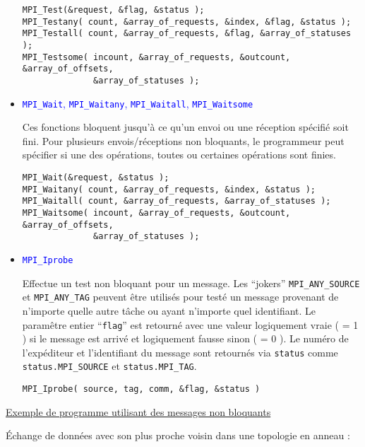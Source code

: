 \documentclass[11pt,a4paper]{article}
\begin{document}
\begin{itemize}
\begin{lstlisting}[style=customcpp]
MPI_Test(&request, &flag, &status );
MPI_Testany( count, &array_of_requests, &index, &flag, &status );
MPI_Testall( count, &array_of_requests, &flag, &array_of_statuses );
MPI_Testsome( incount, &array_of_requests, &outcount, &array_of_offsets, 
              &array_of_statuses );
\end{lstlisting}

\item \textcolor{blue}{\texttt{MPI\_Wait}, \texttt{MPI\_Waitany}, \texttt{MPI\_Waitall}, \texttt{MPI\_Waitsome}}

Ces fonctions bloquent jusqu'à ce qu'un envoi ou une réception spécifié soit fini. Pour plusieurs envois/réceptions
non bloquants, le programmeur peut spécifier si une des opérations, toutes ou certaines opérations sont finies.

\begin{lstlisting}[style=customcpp]
MPI_Wait(&request, &status );
MPI_Waitany( count, &array_of_requests, &index, &status );
MPI_Waitall( count, &array_of_requests, &array_of_statuses );
MPI_Waitsome( incount, &array_of_requests, &outcount, &array_of_offsets, 
              &array_of_statuses );
\end{lstlisting}

\item \textcolor{blue}{\texttt{MPI\_Iprobe}}

Effectue un test non bloquant pour un message. Les ``jokers'' \texttt{MPI\_ANY\_SOURCE} et \texttt{MPI\_ANY\_TAG}
peuvent être utilisés pour testé un message provenant de n'importe quelle autre tâche ou ayant n'importe
quel identifiant. Le paramêtre entier ``\texttt{flag}'' est retourné avec une valeur logiquement vraie ( = 1 )
si le message est arrivé et logiquement fausse sinon ( = 0 ). Le numéro de l'expéditeur et l'identifiant du
message sont retournés via \texttt{status} comme \texttt{status.MPI\_SOURCE} et \texttt{status.MPI\_TAG}.

\begin{lstlisting}[style=customcpp]
MPI_Iprobe( source, tag, comm, &flag, &status )
\end{lstlisting}

\end{itemize}

\underline{Exemple de programme utilisant des messages non bloquants}

\'Echange de données avec son plus proche voisin dans une topologie en anneau :
\end{document}
